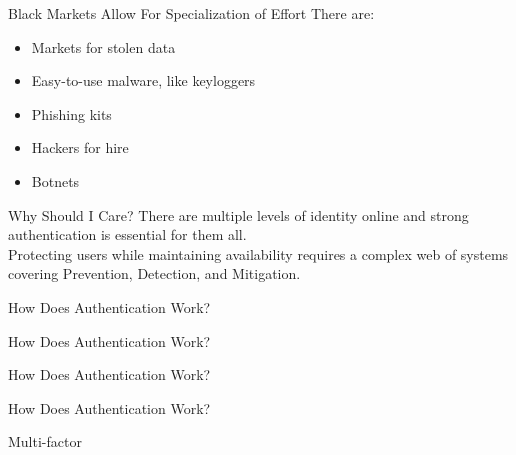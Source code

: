 \documentclass[nobackground,dvipsnames,table]{beamer}
\begin{document}
\begin{frame}{Black Markets Allow For Specialization of Effort}
    There are:
        \begin{itemize}
            \item Markets for stolen data
            \item Easy-to-use malware, like keyloggers 
            \item Phishing kits
            \item Hackers for hire
            \item Botnets 
        \end{itemize}
\end{frame}

\begin{frame}{Why Should I Care?}
    There are multiple levels of identity online and strong authentication is essential for them all. \\
    Protecting users while maintaining availability requires a complex web of systems covering Prevention, Detection, and Mitigation.
\end{frame}




\begin{frame}{How Does Authentication Work?}
    
\end{frame}

\begin{frame}{How Does Authentication Work?}
    
\end{frame}

\begin{frame}{How Does Authentication Work?}
    
\end{frame}

\begin{frame}{How Does Authentication Work?}
    
\end{frame}

\begin{frame}{Multi-factor}
    
\end{frame}

\begin{frame}{} %
    
\end{frame}
\end{document}
